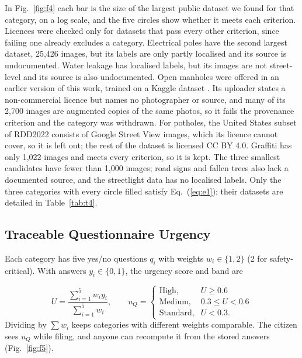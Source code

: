 \documentclass{ieeeaccess}
\begin{document}
In Fig.~\ref{fig:f4} each bar is the size of the largest public dataset we found for that category, on a log scale, and the five circles show whether it meets each criterion. Licences were checked only for datasets that pass every other criterion, since failing one already excludes a category. Electrical poles have the second largest dataset, 25,426 images, but its labels are only partly localised and its source is undocumented. Water leakage has localised labels, but its images are not street-level and its source is also undocumented. Open manholes were offered in an earlier version of this work, trained on a Kaggle dataset \cite{b40}. Its uploader states a non-commercial licence but names no photographer or source, and many of its 2,700 images are augmented copies of the same photos, so it fails the provenance criterion and the category was withdrawn. For potholes, the United States subset of RDD2022 consists of Google Street View images, which its licence cannot cover, so it is left out; the rest of the dataset is licensed CC BY 4.0. Graffiti has only 1,022 images and meets every criterion, so it is kept. The three smallest candidates have fewer than 1,000 images; road signs and fallen trees also lack a documented source, and the streetlight data has no localised labels. Only the three categories with every circle filled satisfy Eq.~(\ref{eq:e1}); their datasets are detailed in Table~\ref{tab:t4}.

\subsection{Traceable Questionnaire Urgency}

Each category has five yes/no questions $q_i$ with weights $w_i\in\{1,2\}$ (2 for safety-critical). With answers $y_i\in\{0,1\}$, the urgency score and band are

\begin{equation}
U=\frac{\sum_{i=1}^{5} w_i y_i}{\sum_{i=1}^{5} w_i},\qquad
u_Q=\begin{cases}\text{High}, & U\ge 0.6\\ \text{Medium}, & 0.3\le U<0.6\\ \text{Standard}, & U<0.3.\end{cases}
\label{eq:e2}
\end{equation}
\noindent Dividing by $\sum w_i$ keeps categories with different weights comparable. The citizen sees $u_Q$ while filing, and anyone can recompute it from the stored answers (Fig.~\ref{fig:f5}).
\end{document}
